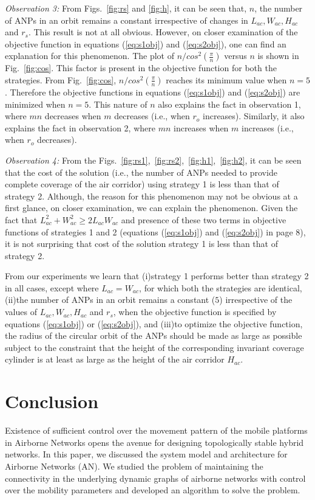 \documentclass[10pt]{IEEEtran}
\begin{document}
\medskip
\noindent
{\em Observation 3: }From Figs.~\ref{fig:rs} and \ref{fig:h}, it can be seen that, $n$, the number of ANPs in an orbit remains a constant irrespective of changes in $L_{ac},W_{ac}, H_{ac}$ and $r_{s}$. This result is not at all obvious. However, on closer examination of the objective function in equations (\ref{eq:s1obj}) and (\ref{eq:s2obj}), one can find an explanation for this phenomenon. The plot of $n/cos^{2}(\frac{\pi}{n})$ versus $n$ is shown in Fig.~\ref{fig:cos}. This factor is present in the objective function for both the strategies. From Fig.~\ref{fig:cos}, $n/cos^{2}(\frac{\pi}{n})$ reaches its minimum value when  $n=5$. Therefore the objective functions in equations (\ref{eq:s1obj}) and (\ref{eq:s2obj}) are minimized when $n = 5$. This nature of $n$ also explains the fact in observation 1, where $mn$ decreases when $m$ decreases (i.e., when $r_o$ increases). Similarly, it also explains the fact in observation 2, where $mn$ increases when $m$ increases (i.e., when $r_o$ decreases).
 
\medskip          
\noindent
 {\em Observation 4: }From the Figs.~\ref{fig:rs1},~\ref{fig:rs2},~\ref{fig:h1},~\ref{fig:h2}, it can be seen that the cost of the solution (i.e., the number of ANPs needed to provide complete coverage of the air corridor) using strategy 1 is less than that of strategy 2. Although, the reason for this phenomenon may not be obvious at a first glance, on closer examination, we can explain the phenomenon.  Given the fact that $L_{ac}^{2} + W_{ac}^{2} \geq 2L_{ac}W_{ac}$ and presence of these two terms in objective functions of strategies 1 and 2 (equations (\ref{eq:s1obj}) and (\ref{eq:s2obj}) in page 8), it is not surprising that cost of the solution strategy 1 is less than that of strategy 2.

From our experiments we learn that (i)strategy 1 performs better than strategy 2 in all cases, except where $L_{ac} = W_{ac}$, for which both the strategies are identical, (ii)the number of ANPs in an orbit remains a constant ($5$) irrespective of the values of $L_{ac},W_{ac}, H_{ac}$ and $r_{s}$, when the objective function is specified  by equations (\ref{eq:s1obj}) or (\ref{eq:s2obj}), and (iii)to optimize the objective function, the radius of the circular orbit of the ANPs should be made as large as possible subject to the constraint that the height of the corresponding invariant coverage cylinder is at least as large as the height of the air corridor $H_{ac}$.

\section{Conclusion}
\label{sec:conclusion}
\balance Existence of sufficient control over the movement pattern of the mobile platforms in Airborne Networks opens the avenue for designing topologically stable hybrid networks. In this paper, we discussed the system model and architecture for Airborne Networks (AN). We studied the problem of maintaining the connectivity in the underlying dynamic graphs of airborne networks with control over the mobility parameters and developed an algorithm to solve the problem. 
\end{document}
